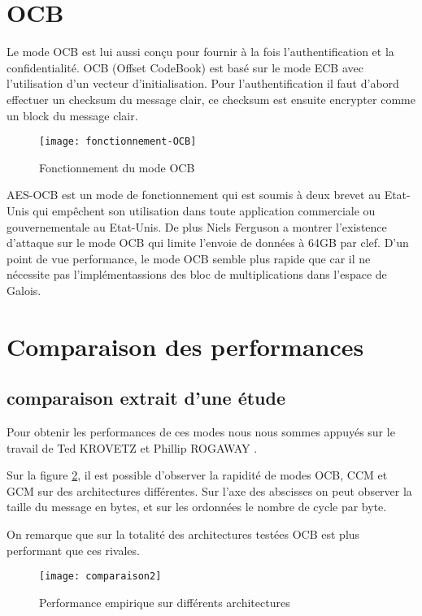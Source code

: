 \newpage


\section{OCB}
Le mode OCB est lui aussi conçu pour fournir à la fois l'authentification et la confidentialité. OCB (Offset CodeBook) est basé sur le mode ECB avec l'utilisation d'un vecteur d'initialisation. Pour l'authentification il faut d'abord effectuer un checksum du message clair, ce checksum est ensuite encrypter comme un block du message clair. 

\begin{figure}[!h]
  \centering
  \texttt{[image: fonctionnement-OCB]}
  \caption{Fonctionnement du mode OCB}
  \label{Fonctionnement du mode OCB}
\end{figure}

AES-OCB est un mode de fonctionnement qui est soumis à deux brevet au Etat-Unis qui empêchent son utilisation dans toute application commerciale ou gouvernementale au Etat-Unis. 
De plus Niels Ferguson a montrer l'existence d'attaque sur le mode OCB qui limite l'envoie de données à 64GB par clef. D'un point de vue performance, le mode OCB semble plus rapide que \aes car il ne nécessite pas l'implémentassions des bloc de multiplications dans l'espace de Galois.


\section{Comparaison des performances}

\subsection{comparaison extrait d'une étude}


Pour obtenir les performances de ces modes nous nous sommes appuyés sur le travail de Ted KROVETZ et Phillip ROGAWAY \cite{compa}.

Sur la figure \ref{fig:compa}, il est possible d'observer la rapidité de modes OCB, CCM et GCM sur des architectures différentes. Sur l'axe des abscisses on peut observer la taille du message en bytes, et sur les ordonnées le nombre de cycle par byte.

On remarque que sur la totalité des architectures testées OCB est plus performant que ces rivales.

\begin{figure}[!h]
  \centering
  \texttt{[image: comparaison2]}
  \caption{Performance empirique sur différents architectures\cite{compa}}
  \label{fig:compa}
\end{figure}

